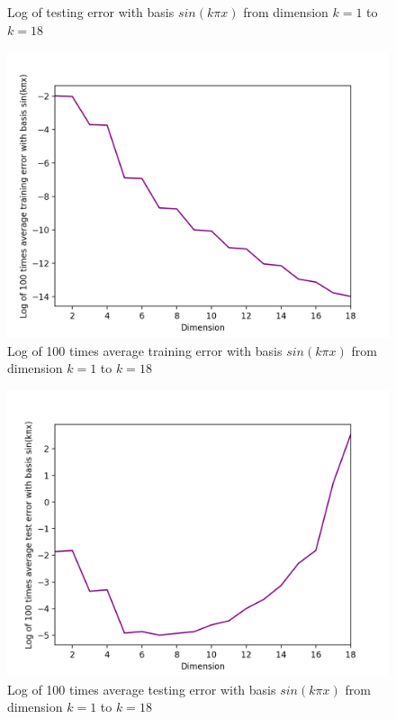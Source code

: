 \documentclass[A4,12pt]{article}
\begin{document}
\begin{enumerate}[1.]
\begin{figure}
        \caption{
          \label{fig:3c}
          Log of testing error with basis $sin(k \pi x)$ from dimension $k=1$ to $k=18$
        }
      \end{figure}
      \begin{figure}
        \centering \includegraphics[width=0.8\columnwidth]{3d1}
        \caption{
          \label{fig:3d1}
          Log of 100 times average training error with basis $sin(k \pi x)$ from dimension $k=1$ to $k=18$
        }
      \end{figure}
      \begin{figure}
        \centering \includegraphics[width=0.8\columnwidth]{3d2}
        \caption{
          \label{fig:3d2}
          Log of 100 times average testing error with basis $sin(k \pi x)$ from dimension $k=1$ to $k=18$
        }
      \end{figure}
\end{enumerate}
\end{document}
